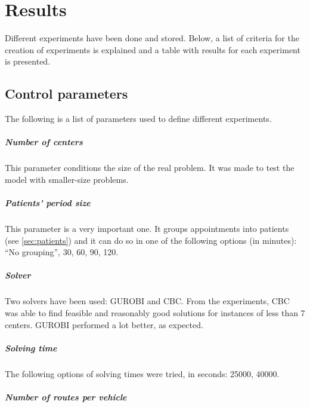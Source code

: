 \chapter{Results}
\label{results}

Different experiments have been done and stored. Below, a list of criteria for the creation of experiments is explained and a table with results for each experiment is presented.

\section{Control parameters}

The following is a list of parameters used to define different experiments.

\paragraph{Number of centers}

This parameter conditions the size of the real problem. It was made to test the model with smaller-size problems.

\paragraph{Patients' period size}

This parameter is a very important one. It groups appointments into patients (see \ref{sec:patients}) and it can do so in one of the following options (in minutes): "`No grouping"', 30, 60, 90, 120.

\paragraph{Solver}

Two solvers have been used: GUROBI and CBC. From the experiments, CBC was able to find feasible and reasonably good solutions for instances of less than 7 centers. GUROBI performed a lot better, as expected.

\paragraph{Solving time}

The following options of solving times were tried, in seconds: 25000, 40000.

\paragraph{Number of routes per vehicle}

